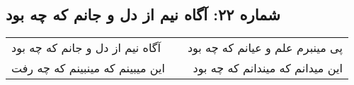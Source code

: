 \begin{center}
\section*{شماره ۲۲: آگاه نیم از دل و جانم که چه بود}
\label{sec:022}
\begin{longtable}{l p{0.5cm} r}
آگاه نیم از دل و جانم که چه بود
&&
پی مینبرم علم و عیانم که چه بود
\\
این میبینم که مینبینم که چه رفت
&&
این میدانم که میندانم که چه بود
\\
\end{longtable}
\end{center}
